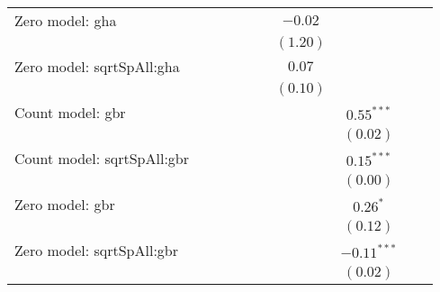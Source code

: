 \begin{center}
\begin{longtable}{l c c c c c c c c c}
Zero model: gha                &               &               &               &                 &               & $-0.02$         &                 &               &               \\
                               &               &               &               &                 &               & $(1.20)$        &                 &               &               \\
Zero model: sqrtSpAll:gha      &               &               &               &                 &               & $0.07$          &                 &               &               \\
                               &               &               &               &                 &               & $(0.10)$        &                 &               &               \\
Count model: gbr               &               &               &               &                 &               &                 & $0.55^{***}$    &               &               \\
                               &               &               &               &                 &               &                 & $(0.02)$        &               &               \\
Count model: sqrtSpAll:gbr     &               &               &               &                 &               &                 & $0.15^{***}$    &               &               \\
                               &               &               &               &                 &               &                 & $(0.00)$        &               &               \\
Zero model: gbr                &               &               &               &                 &               &                 & $0.26^{*}$      &               &               \\
                               &               &               &               &                 &               &                 & $(0.12)$        &               &               \\
Zero model: sqrtSpAll:gbr      &               &               &               &                 &               &                 & $-0.11^{***}$   &               &               \\
                               &               &               &               &                 &               &                 & $(0.02)$        &               &               \\

\end{longtable}
\end{center}
